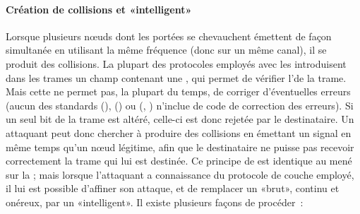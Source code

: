 \paragraph{Création de collisions et  «intelligent»}
Lorsque plusieurs nœuds dont les portées se chevauchent émettent de façon simultanée en utilisant la même fréquence (donc sur un même canal), il se produit des collisions.
La plupart des protocoles \mac employés avec les \rcs introduisent dans les trames un champ contenant une , qui permet de vérifier l'\integrite de la trame.
Mais cette  ne permet pas, la plupart du temps, de corriger d'éventuelles erreurs (aucun des standards \ieeee (\wifi), \ieeefo (\bluetooth) ou \ieeeff (\zigbee, \slowpan) n'inclue de code de correction des erreurs).
Si un seul bit de la trame est altéré, celle-ci est donc rejetée par le destinataire.
Un attaquant peut donc chercher à produire des collisions en émettant un signal en même temps qu'un nœud légitime, afin que le destinataire ne puisse pas recevoir correctement la trame qui lui est destinée.
Ce principe de  est identique au  mené sur la ; mais lorsque l'attaquant a connaissance du protocole de couche \mac{} employé, il lui est possible d'affiner son attaque, et de remplacer un  «brut», continu et onéreux, par un  «intelligent».
Il existe plusieurs façons de procéder~\cite{PI11}:
